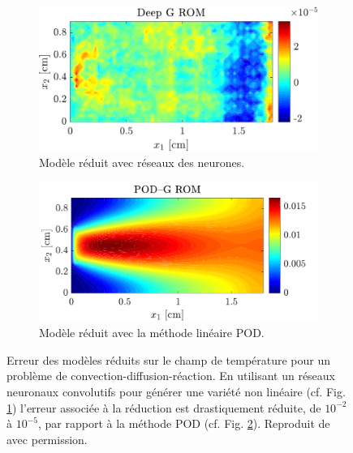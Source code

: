 \documentclass[12pt, french]{article}
\begin{document}
	\begin{figure}[t]
		\begin{subfigure}[t]{0.465\textwidth}
			\includegraphics[width=\columnwidth]{DGROM_T_param1.pdf} 
			\caption{Modèle réduit avec réseaux des neurones.}
			\label{fig:DG_ROM}
		\end{subfigure}\hfill
		\begin{subfigure}[t]{0.48\textwidth}
			\includegraphics[width=\columnwidth]{GROM_T_param1.pdf}%
			\caption{Modèle réduit avec la méthode linéaire POD.}
			\label{fig:POD_ROM}
		\end{subfigure}
		\caption[]{Erreur des modèles réduits sur le champ de température pour un problème de convection-diffusion-réaction. En utilisant un réseaux neuronaux convolutifs pour générer une variété non linéaire (cf. Fig. \ref{fig:DG_ROM}) l'erreur associée à la réduction  est drastiquement réduite, de $10^{-2}$ à $10^{-5}$, par rapport à la méthode POD (cf. Fig. \ref{fig:POD_ROM}). Reproduit de \cite{lee2020} avec permission.}%
		\label{fig:deepROM}%
	\end{figure}
\end{document}
